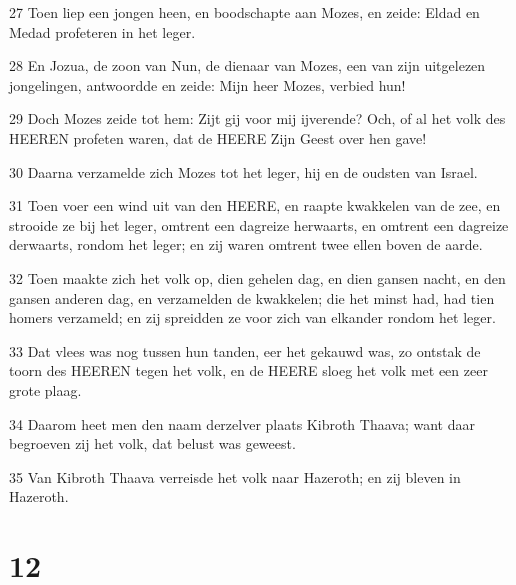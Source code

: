 \par 27 Toen liep een jongen heen, en boodschapte aan Mozes, en zeide: Eldad en Medad profeteren in het leger.
\par 28 En Jozua, de zoon van Nun, de dienaar van Mozes, een van zijn uitgelezen jongelingen, antwoordde en zeide: Mijn heer Mozes, verbied hun!
\par 29 Doch Mozes zeide tot hem: Zijt gij voor mij ijverende? Och, of al het volk des HEEREN profeten waren, dat de HEERE Zijn Geest over hen gave!
\par 30 Daarna verzamelde zich Mozes tot het leger, hij en de oudsten van Israel.
\par 31 Toen voer een wind uit van den HEERE, en raapte kwakkelen van de zee, en strooide ze bij het leger, omtrent een dagreize herwaarts, en omtrent een dagreize derwaarts, rondom het leger; en zij waren omtrent twee ellen boven de aarde.
\par 32 Toen maakte zich het volk op, dien gehelen dag, en dien gansen nacht, en den gansen anderen dag, en verzamelden de kwakkelen; die het minst had, had tien homers verzameld; en zij spreidden ze voor zich van elkander rondom het leger.
\par 33 Dat vlees was nog tussen hun tanden, eer het gekauwd was, zo ontstak de toorn des HEEREN tegen het volk, en de HEERE sloeg het volk met een zeer grote plaag.
\par 34 Daarom heet men den naam derzelver plaats Kibroth Thaava; want daar begroeven zij het volk, dat belust was geweest.
\par 35 Van Kibroth Thaava verreisde het volk naar Hazeroth; en zij bleven in Hazeroth.

\chapter{12}

